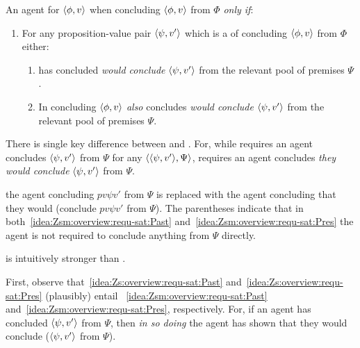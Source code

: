 \begin{note}
  \begin{idea}
    \label{idea:Zsm:overview}
    An agent \csV{} for \(\langle \phi, v \rangle\) when concluding \(\langle \phi, v \rangle\) from \(\Phi\) \emph{only if}:
    \begin{enumerate}[label=\arabic*., ref=\named{CS\(^{-}\):\arabic*}]
    \item
      \label{idea:Zsm:overview:requ}
      For any proposition-value pair \(\langle \psi, v' \rangle\) which is a \requ{} of concluding \(\langle \phi, v \rangle\) from \(\Phi\) either:
      \begin{enumerate}[label=\alph*., ref=\named{CS\(^{-}\):1.\alph*}]
      \item
        \label{idea:Zsm:overview:requ-sat:Past}
        \label{idea:Zsm:overview:requ-sat:Past}
        \vAgent{} has concluded \emph{\vAgent{} would conclude} \(\langle \psi, v' \rangle\) from the relevant pool of premises \(\Psi\).
      \item
        \label{idea:Zsm:overview:requ-sat:Pres}
        In concluding \(\langle \phi, v \rangle\) \vAgent{} \emph{also} concludes \emph{\vAgent{} would conclude} \(\langle \psi, v' \rangle\) from the relevant pool of premises \(\Psi\).
      \end{enumerate}
    \end{enumerate}
    \vspace{-\baselineskip}
  \end{idea}
\end{note}

\begin{note}
  There is single key difference between \iCS{} and \iCSm{}.
  For, while \iCS{} requires an agent concludes  \(\langle \psi, v' \rangle\) from \(\Psi\) for any \requ{} \(\langle \langle \psi, v' \rangle, \Psi \rangle\), \iCSm{} requires an agent concludes \emph{they would conclude} \(\langle \psi, v' \rangle\) from \(\Psi\).

  the agent concluding \(pv{\psi}{v'}\) from \(\Psi\) is replaced with the agent concluding that they would (conclude \(pv{\psi}{v'}\) from \(\Psi\)).
  The parentheses indicate that in both~\ref{idea:Zsm:overview:requ-sat:Past} and~\ref{idea:Zsm:overview:requ-sat:Pres} the agent is not required to conclude anything from \(\Psi\) directly.

  \iCS{} is intuitively stronger than \iCSm{}.

  First, observe that~\ref{idea:Zs:overview:requ-sat:Past} and~\ref{idea:Zs:overview:requ-sat:Pres} (plausibly) entail ~\ref{idea:Zsm:overview:requ-sat:Past} and~\ref{idea:Zsm:overview:requ-sat:Pres}, respectively.
  For, if an agent has concluded \(\langle \psi, v' \rangle\) from \(\Psi\), then \emph{in so doing} the agent has shown that they would conclude (\(\langle \psi, v' \rangle\) from \(\Psi\)).
\end{note}


